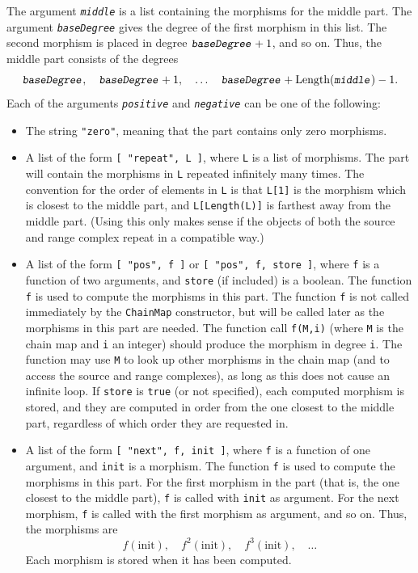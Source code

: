 \documentclass[a4paper,11pt]{report}
\begin{document}
{{{ The argument \mbox{\texttt{\mdseries\slshape middle}} is a list containing the morphisms for the middle part. The argument \mbox{\texttt{\mdseries\slshape baseDegree}} gives the degree of the first morphism in this list. The second morphism is
placed in degree $\mbox{\texttt{\mdseries\slshape baseDegree}}+1$, and so on. Thus, the middle part consists of the degrees 
\[ \mbox{\texttt{\mdseries\slshape baseDegree}},\quad \mbox{\texttt{\mdseries\slshape baseDegree}} + 1,\quad \ldots\quad \mbox{\texttt{\mdseries\slshape baseDegree}} + \text{Length}(\mbox{\texttt{\mdseries\slshape middle}}) - 1. \]
 Each of the arguments \mbox{\texttt{\mdseries\slshape positive}} and \mbox{\texttt{\mdseries\slshape negative}} can be one of the following: 
\begin{itemize}
\item The string \texttt{"zero"}, meaning that the part contains only zero morphisms.
\item A list of the form \texttt{[ "repeat", L ]}, where \texttt{L} is a list of morphisms. The part will contain the morphisms in \texttt{L} repeated infinitely many times. The convention for the order of elements in \texttt{L} is that \texttt{L[1]} is the morphism which is closest to the middle part, and \texttt{L[Length(L)]} is farthest away from the middle part. (Using this only makes sense if the
objects of both the source and range complex repeat in a compatible way.)
\item A list of the form \texttt{[ "pos", f ]} or \texttt{[ "pos", f, store ]}, where \texttt{f} is a function of two arguments, and \texttt{store} (if included) is a boolean. The function \texttt{f} is used to compute the morphisms in this part. The function \texttt{f} is not called immediately by the \texttt{ChainMap} constructor, but will be called later as the morphisms in this part are
needed. The function call \texttt{f(M,i)} (where \texttt{M} is the chain map and \texttt{i} an integer) should produce the morphism in degree \texttt{i}. The function may use \texttt{M} to look up other morphisms in the chain map (and to access the source and
range complexes), as long as this does not cause an infinite loop. If \texttt{store} is \texttt{true} (or not specified), each computed morphism is stored, and they are computed in
order from the one closest to the middle part, regardless of which order they
are requested in.
\item A list of the form \texttt{[ "next", f, init ]}, where \texttt{f} is a function of one argument, and \texttt{init} is a morphism. The function \texttt{f} is used to compute the morphisms in this part. For the first morphism in the
part (that is, the one closest to the middle part), \texttt{f} is called with \texttt{init} as argument. For the next morphism, \texttt{f} is called with the first morphism as argument, and so on. Thus, the morphisms
are 
\[ f(\text{init}),\quad f^2(\text{init}),\quad f^3(\text{init}),\quad \ldots \]
 Each morphism is stored when it has been computed. 
\end{itemize}
 }

}}
\end{document}

